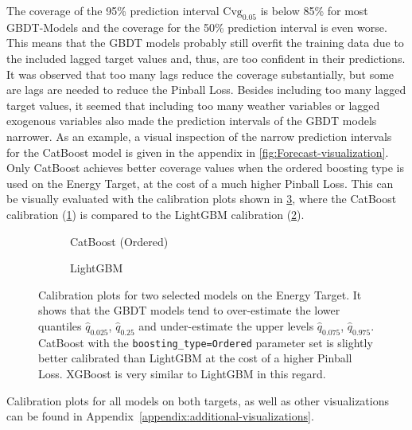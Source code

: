 The coverage of the 95\% prediction interval $\text{Cvg}_{0.05}$ is below 85\% for most GBDT-Models and the coverage for the 50\% prediction interval is even worse. This means that the GBDT models probably still overfit the training data due to the included lagged target values and, thus, are too confident in their predictions. It was observed that too many lags reduce the coverage substantially, but some are lags are needed to reduce the Pinball Loss. Besides including too many lagged target values, it seemed that including too many weather variables or lagged exogenous variables also made the prediction intervals of the GBDT models narrower. As an example, a visual inspection of the narrow prediction intervals for the CatBoost model is given in the appendix in \cref{fig:Forecast-visualization}.
Only CatBoost achieves better coverage values when the ordered boosting type is used on the Energy
Target, at the cost of a much higher Pinball Loss. This can be visually evaluated with the calibration plots shown in \cref{fig:calibration-comparison}, where the CatBoost calibration (\cref{fig:catboost-ordered-calibration}) is compared to the LightGBM calibration (\cref{fig:lgbm-calibration}).
\begin{figure}[htbp]
    \centering
    \begin{subfigure}[b]{0.5\textwidth}
        \centering
        
        \caption{CatBoost (Ordered)}
        \label{fig:catboost-ordered-calibration}
    \end{subfigure}%
    \begin{subfigure}[b]{0.5\textwidth}
        \centering
        
        \caption{LightGBM}
        \label{fig:lgbm-calibration}
    \end{subfigure}
    \caption{Calibration plots for two selected models on the Energy Target. It shows that the GBDT models tend to over-estimate the lower quantiles $\hat{q}_{0.025}$, $\hat{q}_{0.25}$ and under-estimate the upper levels $\hat{q}_{0.075}$, $\hat{q}_{0.975}$. CatBoost with the \texttt{boosting\_type=Ordered} parameter set is slightly better calibrated than LightGBM at the cost of a higher Pinball Loss. XGBoost is very similar to LightGBM in this regard.}
    \label{fig:calibration-comparison}
\end{figure}

Calibration plots for all models on both targets, as well as other visualizations can be found in Appendix~\ref{appendix:additional-visualizations}.


